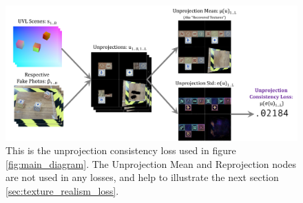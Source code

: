 \documentclass{article}
\begin{document}
		\begin{figure}[thbp]
		    \vspace{-10pt}
			\begin{center}
				\includegraphics[width=.8\textwidth]{../images/unprojection_consistency_loss_without_reprojection.pdf}
			\end{center}
			\vspace{-5pt}
			\caption{
				This is the unprojection consistency loss used in figure \ref{fig:main_diagram}.
				The Unprojection Mean and Reprojection nodes are not used in any losses, and help to illustrate the next section \ref{sec:texture_realism_loss}.
			}
			\label{fig:unprojection_consistency_loss}
		\end{figure}
\end{document}
